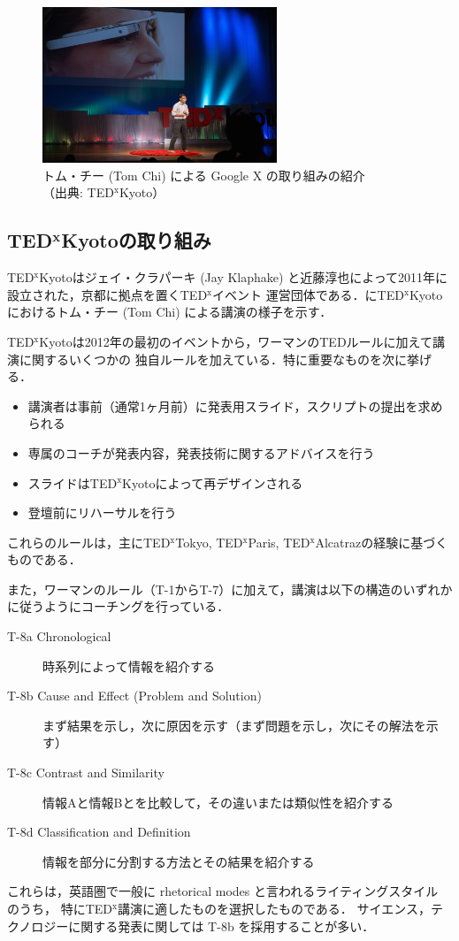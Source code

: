 \documentclass[submit,techreq,jkeyword,noauthor]{ipsj}
\newcommand{\TED}{\textrm{TED}}
\newcommand{\TEDx}{\TED${}^{\textrm{x}}$}
\newcommand{\TEDxTokyo}{\TEDx\textrm{Tokyo}}
\newcommand{\TEDxKyoto}{\TEDx\textrm{Kyoto}}
\newcommand{\TEDxParis}{\TEDx\textrm{Paris}}
\newcommand{\TEDxAlcatraz}{\TEDx\textrm{Alcatraz}}
\newcommand{\TEDtitle}{\textbf{TED}}
\newcommand{\TEDxtitle}{\TEDtitle${}^{\textbf{x}}$}
\newcommand{\TEDxKyototitle}{\TEDxtitle\textbf{Kyoto}}
\begin{document}
\begin{figure}[t]
\begin{center}
\includegraphics[width=7cm,clip]{tom_chi.png}
\end{center}
\caption{トム・チー (Tom Chi) による Google X の取り組みの紹介\\
（出典: \TEDxKyoto ）}
\label{fig:tomchi}
\end{figure}

\subsection{\TEDxKyototitle の取り組み}

\TEDxKyoto はジェイ・クラパーキ (Jay Klaphake) と近藤淳也によって2011年に設立された，京都に拠点を置く\TEDx イベント
運営団体である．に\TEDxKyoto におけるトム・チー (Tom Chi) による講演の様子を示す．

\TEDxKyoto は2012年の最初のイベントから，ワーマンの\TED ルールに加えて講演に関するいくつかの
独自ルールを加えている．特に重要なものを次に挙げる．
\begin{itemize}
\item 講演者は事前（通常1ヶ月前）に発表用スライド，スクリプトの提出を求められる
\item 専属のコーチが発表内容，発表技術に関するアドバイスを行う
\item スライドは\TEDxKyoto によって再デザインされる
\item 登壇前にリハーサルを行う
\end{itemize}
これらのルールは，主に\TEDxTokyo, \TEDxParis, \TEDxAlcatraz の経験に基づくものである．

また，ワーマンのルール（T-1からT-7）に加えて，講演は以下の構造のいずれかに従うようにコーチングを行っている．
\begin{description}
\item[T-8a Chronological] 時系列によって情報を紹介する
\item[T-8b Cause and Effect (Problem and Solution)] まず結果を示し，次に原因を示す（まず問題を示し，次にその解法を示す）
\item[T-8c Contrast and Similarity] 情報Aと情報Bとを比較して，その違いまたは類似性を紹介する
\item[T-8d Classification and Definition] 情報を部分に分割する方法とその結果を紹介する
\end{description}
これらは，英語圏で一般に rhetorical modes と言われるライティングスタイル \cite{cs} のうち，
特に\TEDx 講演に適したものを選択したものである．
サイエンス，テクノロジーに関する発表に関しては T-8b を採用することが多い．
\end{document}

